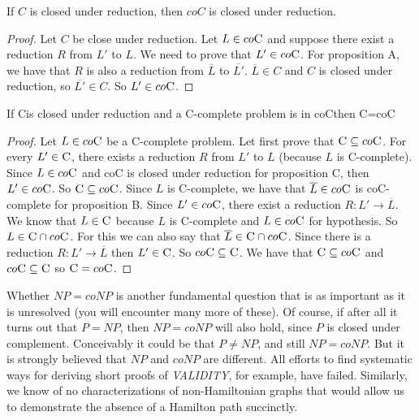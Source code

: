 \documentclass[12pt]{article}
\newcommand{\C}{\textsc{C}}
\newcommand{\coC}{co\textsc{C}}
\begin{document}
\begin{defbox}[Proposition C]
  If $C$ is closed under reduction, then $coC$ is closed under reduction.
\end{defbox}
\begin{proof}
  Let $C$ be close under reduction. Let $L\in\coC$ and suppose there exist a reduction $R$ from $L'$ to $L$. We need to prove that $L'\in\coC$.
  For proposition A, we have that $R$ is also a reduction from $\overline{L}$ to $\overline{L'}$. $\overline{L}\in C$ and $C$ is closed under reduction, so $\overline{L'}\in C$. So $L'\in \coC$.
\end{proof}

\begin{defbox}[Proposition D]
  If \C is closed under reduction and a \C-complete problem is in \coC then \C=\coC
\end{defbox}
\begin{proof}
  Let $L\in\coC$ be a \C-complete problem. Let first prove that $\C\subseteq\coC$. For every $L'\in\C$, there exists a reduction $R$ from $L'$ to $L$ (because $L$ is \C-complete). Since $L\in\coC$ and co\textsc{C} is closed under reduction for proposition C, then $L'\in\coC$. So $\C\subseteq\coC$. Since $L$ is \C-complete, we have that $\overline{L}\in\coC$ is \coC-complete for proposition B. Since $L'\in\coC$, there exist a reduction $R: L'\to\overline{L}$. We know that $L\in\C$ because $L$ is \C-complete and $L\in\coC$ for hypothesis. So $L\in\C\cap\coC$. For this we can also say that $\overline{L}\in\C\cap\coC$. Since there is a reduction $R: L'\to\overline{L}$ then $L'\in\C$. So $\coC\subseteq\C$. We have that $\C\subseteq\coC$ and $\coC\subseteq\C$ so $\C=\coC$. 
\end{proof}
Whether $NP = coNP$ is another fundamental question that is as important as it is unresolved (you will encounter many more of these). Of course, if after all it turns out that $P = NP$, then $NP = coNP$ will also hold, since $P$ is closed under complement. Conceivably it could be that $P \neq NP$, and still $NP = coNP$. But it is strongly believed that $NP$ and $coNP$ are different. All efforts to find systematic ways for deriving short proofs of \textit{VALIDITY}, for example, have failed. Similarly, we know of no characterizations of non-Hamiltonian graphs that would allow us to demonstrate the absence of a Hamilton path succinctly.
\end{document}
